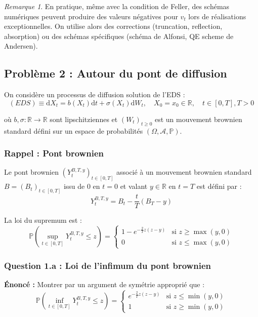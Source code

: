 \documentclass[12pt,a4paper]{article}
\theoremstyle{definition}
\theoremstyle{remark}
\newtheorem*{remark}{Remarque}
\newcommand{\R}{\mathbb{R}}
\newcommand{\Prob}{\mathbb{P}}
\newcommand{\dd}{\mathrm{d}}
\begin{document}
\begin{remark}
En pratique, même avec la condition de Feller, des schémas numériques peuvent produire des valeurs négatives pour $v_t$ lors de réalisations exceptionnelles. On utilise alors des corrections (truncation, reflection, absorption) ou des schémas spécifiques (schéma de Alfonsi, QE scheme de Andersen).
\end{remark}

\newpage
\subsection{Problème 2 : Autour du pont de diffusion}

On considère un processus de diffusion solution de l'EDS :
\[
(EDS) \equiv \dd X_t = b(X_t)\dd t + \sigma(X_t)\dd W_t, \quad X_0 = x_0 \in \R, \quad t \in [0,T], T > 0
\]

où $b, \sigma : \R \to \R$ sont lipschitziennes et $(W_t)_{t \geq 0}$ est un mouvement brownien standard défini sur un espace de probabilités $(\Omega, \mathcal{A}, \Prob)$.

\subsubsection{Rappel : Pont brownien}

Le pont brownien $(Y_t^{B,T,y})_{t \in [0,T]}$ associé à un mouvement brownien standard $B = (B_t)_{t \in [0,T]}$ issu de $0$ en $t=0$ et valant $y \in \R$ en $t=T$ est défini par :
\[
Y_t^{B,T,y} = B_t - \frac{t}{T}(B_T - y)
\]

La loi du supremum est :
\[
\Prob\left(\sup_{t \in [0,T]} Y_t^{B,T,y} \leq z\right) = \begin{cases}
1 - e^{-\frac{2}{T}z(z-y)} & \text{si } z \geq \max(y,0) \\
0 & \text{si } z \leq \max(y,0)
\end{cases}
\]

\subsubsection{Question 1.a : Loi de l'infimum du pont brownien}

\textbf{Énoncé :} Montrer par un argument de symétrie approprié que :
\[
\Prob\left(\inf_{t \in [0,T]} Y_t^{B,T,y} \leq z\right) = \begin{cases}
e^{-\frac{2}{T}z(z-y)} & \text{si } z \leq \min(y,0) \\
1 & \text{si } z \geq \min(y,0)
\end{cases}
\]
\end{document}
